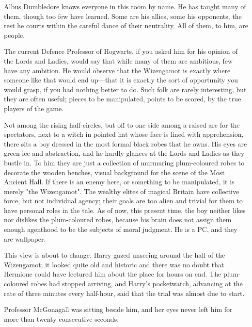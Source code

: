 Albus Dumbledore knows everyone in this room by name. He has taught many of
them, though too few have learned. Some are his allies, some his opponents, the
rest he courts within the careful dance of their neutrality. All of them, to
him, are people.

The current Defence Professor of Hogwarts, if you asked him for his opinion of
the Lords and Ladies, would say that while many of them are ambitious, few have
any ambition. He would observe that the Wizengamot is exactly where someone
like that would end up—that it is exactly the sort of opportunity you would
grasp, if you had nothing better to do. Such folk are rarely interesting, but
they are often useful; pieces to be manipulated, points to be scored, by the
true players of the game.

Not among the rising half-circles, but off to one side among a raised arc for
the spectators, next to a witch in pointed hat whose face is lined with
apprehension, there sits a boy dressed in the most formal black robes that he
owns. His eyes are green ice and abstraction, and he hardly glances at the
Lords and Ladies as they bustle in. To him they are just a collection of
murmuring plum-coloured robes to decorate the wooden benches, visual background
for the scene of the Most Ancient Hall. If there is an enemy here, or something
to be manipulated, it is merely "the Wizengamot". The wealthy elites of magical
Britain have collective force, but not individual agency; their goals are too
alien and trivial for them to have personal roles in the tale. As of now, this
present time, the boy neither likes nor dislikes the plum-coloured robes,
because his brain does not assign them enough agenthood to be the subjects of
moral judgment. He is a PC, and they are wallpaper.

This view is about to change.
\later
Harry gazed unseeing around the hall of the Wizengamot; it looked quite old and
historic and there was no doubt that Hermione could have lectured him about the
place for hours on end. The plum-coloured robes had stopped arriving, and
Harry’s pocketwatch, advancing at the rate of three minutes every half-hour,
said that the trial was almost due to start.

Professor McGonagall was sitting beside him, and her eyes never left him for
more than twenty consecutive seconds.

